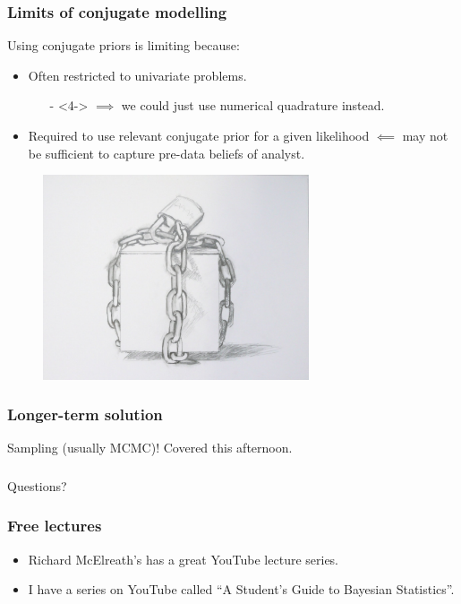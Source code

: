 \documentclass[handout]{beamer}
\begin{document}
\begin{frame}
	\frametitle{Limits of conjugate modelling}
	 Using conjugate priors is limiting because:
	
	\begin{itemize}
		\item<3-> Often restricted to univariate problems.
		\begin{itemize}
			\item[-]<4-> $\implies$ we could just use numerical quadrature instead.
		\end{itemize}
		\item<5-> Required to use relevant conjugate prior for a given likelihood $\impliedby$ may not be sufficient to capture pre-data beliefs of analyst.
	\end{itemize}
	
	\begin{figure}
		\centerline{\includegraphics[width=0.7\textwidth]{./animations_figures/trapped.jpg}}
	\end{figure}
	
\end{frame}

\begin{frame}
	\frametitle{Longer-term solution}
	
	\Large Sampling (usually MCMC)! Covered this afternoon.
\end{frame}

\begin{frame}
	\frametitle{}
	{\Huge Questions?}
\end{frame}

\begin{frame}
	\frametitle{Free lectures}
	
	\begin{itemize}
		\item Richard McElreath's has a great YouTube lecture series.
		\item I have a series on YouTube called ``A Student's Guide to Bayesian Statistics''.
	\end{itemize}
	
\end{frame}
\end{document}
